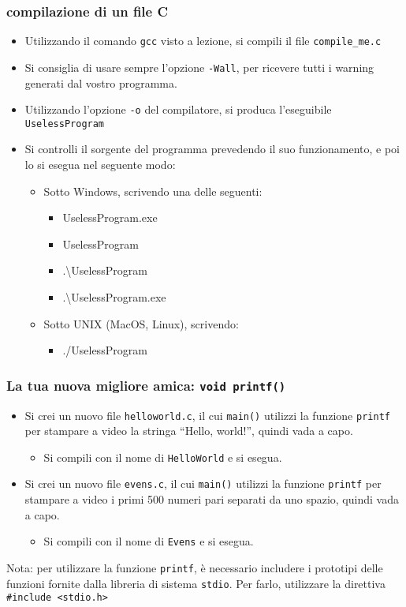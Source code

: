 \documentclass{beamer}
\begin{document}
\begin{frame}
\frametitle{compilazione di un file C}
\begin{itemize}
 \item Utilizzando il comando \texttt{gcc} visto a lezione, si compili il file \texttt{compile\_me.c}
 \item \alert{Si consiglia di usare sempre l'opzione \texttt{-Wall}, per ricevere tutti i warning generati dal vostro programma.}
 \item Utilizzando l'opzione \texttt{-o} del compilatore, si produca l'eseguibile \texttt{UselessProgram}
 \item Si controlli il sorgente del programma prevedendo il suo funzionamento, e poi lo si esegua nel seguente modo:
 \begin{itemize}
  \item Sotto Windows, scrivendo una delle seguenti:
  \begin{itemize}
    \item UselessProgram.exe
    \item UselessProgram
    \item .\textbackslash{}UselessProgram
    \item .\textbackslash{}UselessProgram.exe
  \end{itemize}
  \item Sotto UNIX (MacOS, Linux), scrivendo:
  \begin{itemize}
    \item ./UselessProgram
  \end{itemize}
 \end{itemize}
\end{itemize}
\end{frame}

\begin{frame}
\frametitle{La tua nuova migliore amica: \texttt{void printf()}}
\begin{itemize}
 \item Si crei un nuovo file \texttt{helloworld.c}, il cui \texttt{main()} utilizzi la funzione \texttt{printf} per stampare a video la stringa ``Hello, world!'', quindi vada a capo.
  \begin{itemize}
    \item Si compili con il nome di \texttt{HelloWorld} e si esegua.
  \end{itemize}
 \item Si crei un nuovo file \texttt{evens.c}, il cui \texttt{main()} utilizzi la funzione \texttt{printf} per stampare a video i primi 500 numeri pari separati da uno spazio, quindi vada a capo.
  \begin{itemize}
    \item Si compili con il nome di \texttt{Evens} e si esegua.
  \end{itemize}
\end{itemize}
Nota: per utilizzare la funzione \texttt{printf}, è necessario includere i prototipi delle funzioni fornite dalla libreria di sistema \texttt{stdio}. Per farlo, utilizzare la direttiva \texttt{\#include <stdio.h>}
\end{frame}
\end{document}
